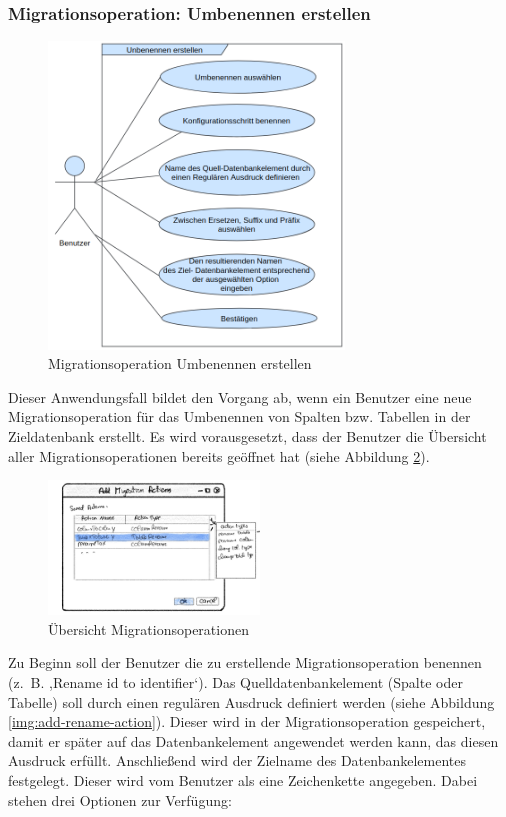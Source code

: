 \subsubsection{Migrationsoperation: Umbenennen erstellen}
\label{section:umbenennen}
\begin{figure}[H]
	\centering
	\includegraphics[width=0.7\textwidth]{images/af/af-umbenennen}
	\caption{Migrationsoperation \glqq Umbenennen \grqq erstellen}
	\label{img:af-umbenennen}
\end{figure}
Dieser Anwendungsfall bildet den Vorgang ab, wenn ein Benutzer eine neue Migrationsoperation für das Umbenennen von Spalten bzw. Tabellen in der Zieldatenbank erstellt. Es wird vorausgesetzt, dass der Benutzer die Übersicht aller Migrationsoperationen bereits geöffnet hat (siehe Abbildung \ref{img:actions-overview}). \\
\begin{figure}[H]
	\centering
	\includegraphics[width=0.5\textwidth]{images/actions-overview}
	\caption{Übersicht Migrationsoperationen}
	\label{img:actions-overview}
\end{figure}
Zu Beginn soll der Benutzer die zu erstellende Migrationsoperation benennen (z. B. ,Rename id to identifier‘). Das Quelldatenbankelement (Spalte oder Tabelle) soll durch einen regulären Ausdruck definiert werden (siehe Abbildung \ref{img:add-rename-action}). Dieser wird in der Migrationsoperation gespeichert, damit er später auf das Datenbankelement angewendet werden kann, das diesen Ausdruck erfüllt. Anschließend wird der Zielname des Datenbankelementes festgelegt. Dieser wird vom Benutzer als eine Zeichenkette angegeben. Dabei stehen drei Optionen zur Verfügung:
